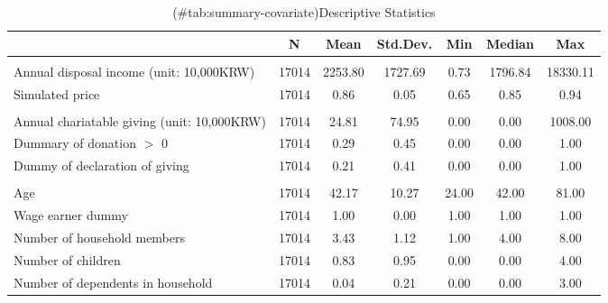 \begin{table}

\caption{(\#tab:summary-covariate)Descriptive Statistics}
\centering
\fontsize{8}{10}\selectfont
\begin{threeparttable}
\begin{tabular}[t]{lcccccc}
\toprule
  & N & Mean & Std.Dev. & Min & Median & Max\\
\midrule
\addlinespace[0.3em]
\multicolumn{7}{l}{\textit{Income and giving price}}\\
\hspace{1em}Annual disposal income (unit: 10,000KRW) & 17014 & \num{2253.80} & \num{1727.69} & \num{0.73} & \num{1796.84} & \num{18330.11}\\
\hspace{1em}Simulated price & 17014 & \num{0.86} & \num{0.05} & \num{0.65} & \num{0.85} & \num{0.94}\\
\addlinespace[0.3em]
\multicolumn{7}{l}{\textit{Charitable giving}}\\
\hspace{1em}Annual chariatable giving (unit: 10,000KRW) & 17014 & \num{24.81} & \num{74.95} & \num{0.00} & \num{0.00} & \num{1008.00}\\
\hspace{1em}Dummary of donation $>$ 0 & 17014 & \num{0.29} & \num{0.45} & \num{0.00} & \num{0.00} & \num{1.00}\\
\hspace{1em}Dummy of declaration of giving & 17014 & \num{0.21} & \num{0.41} & \num{0.00} & \num{0.00} & \num{1.00}\\
\addlinespace[0.3em]
\multicolumn{7}{l}{\textit{Demographics}}\\
\hspace{1em}Age & 17014 & \num{42.17} & \num{10.27} & \num{24.00} & \num{42.00} & \num{81.00}\\
\hspace{1em}Wage earner dummy & 17014 & \num{1.00} & \num{0.00} & \num{1.00} & \num{1.00} & \num{1.00}\\
\hspace{1em}Number of household members & 17014 & \num{3.43} & \num{1.12} & \num{1.00} & \num{4.00} & \num{8.00}\\
\hspace{1em}Number of children & 17014 & \num{0.83} & \num{0.95} & \num{0.00} & \num{0.00} & \num{4.00}\\
\hspace{1em}Number of dependents in household & 17014 & \num{0.04} & \num{0.21} & \num{0.00} & \num{0.00} & \num{3.00}\\

\end{tabular}
\end{threeparttable}
\end{table}
